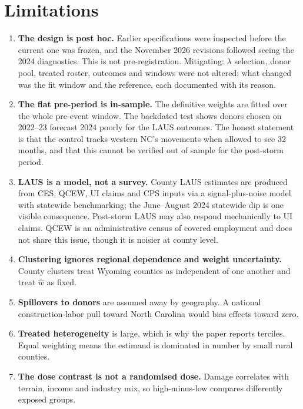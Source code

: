 \documentclass[11pt,a4paper]{article}
\begin{document}
\section{Limitations}

\begin{enumerate}[leftmargin=1.4em]
\item \textbf{The design is post hoc.} Earlier specifications were inspected before the current one was
frozen, and the November 2026 revisions followed seeing the 2024 diagnostics. This is not
pre-registration. Mitigating: $\lambda$ selection, donor pool, treated roster, outcomes and windows were
not altered; what changed was the fit window and the reference, each documented with its reason.

\item \textbf{The flat pre-period is in-sample.} The definitive weights are fitted over the whole
pre-event window. The backdated test shows donors chosen on 2022--23 forecast 2024 poorly for the LAUS
outcomes. The honest statement is that the control tracks western NC's movements when allowed to see 32
months, and that this cannot be verified out of sample for the post-storm period.

\item \textbf{LAUS is a model, not a survey.} County LAUS estimates are produced from CES, QCEW, UI
claims and CPS inputs via a signal-plus-noise model with statewide benchmarking; the June--August 2024
statewide dip is one visible consequence. Post-storm LAUS may also respond mechanically to UI claims.
QCEW is an administrative census of covered employment and does not share this issue, though it is
noisier at county level.

\item \textbf{Clustering ignores regional dependence and weight uncertainty.} County clusters treat
Wyoming counties as independent of one another and treat $\widehat w$ as fixed.

\item \textbf{Spillovers to donors} are assumed away by geography. A national construction-labor pull
toward North Carolina would bias effects toward zero.

\item \textbf{Treated heterogeneity} is large, which is why the paper reports terciles. Equal weighting
means the estimand is dominated in number by small rural counties.

\item \textbf{The dose contrast is not a randomised dose.} Damage correlates with terrain, income and
industry mix, so high-minus-low compares differently exposed groups.
\end{enumerate}
\end{document}
